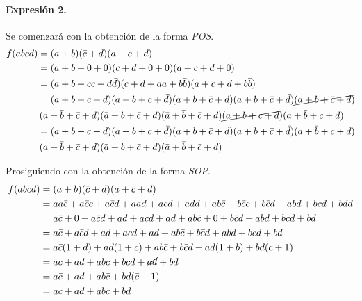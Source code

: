\documentclass[../procedimientos.tex]{subfiles}
\begin{document}
\paragraph{Expresión 2.} Se comenzará con la obtención de la forma 
\textit{POS}.
\begin{align*}
  f(abcd) &= (a + b) (\bar{c} + d)(a + c + d)\\
  &= (a + b + 0 + 0) (\bar{c} + d + 0 + 0)(a + c + d + 0)\\
  &= (a + b + c\bar{c} + d\bar{d})(\bar{c} + d + a\bar{a} + b\bar{b})(a + c + d + b 
  \bar{b})\\
  &= (a + b + c + d) (a + b + c + \bar{d}) (a + b + \bar{c} + d) (a + b + \bar{c} 
  + \bar{d}) \cancel{(a + b + \bar{c} + d)}\\
  &\,  (a + \bar{b} + \bar{c} + d) (\bar{a} + b + \bar{c} + d) (\bar{a} + \bar{b} + 
  \bar{c} + d) \cancel{(a + b + c + d)} (a + \bar{b} + c + d)\\
  &= (a + b + c + d) (a + b + c + \bar{d}) (a + b + \bar{c} + d) (a + b + \bar{c} 
  + \bar{d}) (a + \bar{b} + c + d)\\
  &\,  (a + \bar{b} + \bar{c} + d)(\bar{a} + b + \bar{c} + d) (\bar{a} + \bar{b} + 
  \bar{c} + d)
\end{align*}

Prosiguiendo con la obtención de la forma \textit{SOP}.
\begin{align*}
  f(abcd) &= (a + b) (\bar{c} + d)(a + c + d)\\
  &= a a \bar{c} + a \bar{c} c + a \bar{c} d + a a d + a c d + a d d + a b \bar{c} 
+ b \bar{c} c + b \bar{c} d + a b d + b c d + b d d\\
  &= a \bar{c} + 0 + a \bar{c} d + a d + a c d + a d + a b \bar{c} + 0 + b \bar{c} 
d + a b d + b c d + b d\\
  &= a \bar{c} + a \bar{c} d + a d + a c d + a d + a b \bar{c} + b \bar{c} d + a b 
d + b c d + b d\\
  &= a \bar{c} (1 + d) + a d (1 + c) + a b \bar{c} + b \bar{c} d + ad (1 + b) + 
  bd( c + 1)\\
  &= a \bar{c} + a d + a b \bar{c} + b \bar{c} d + \cancel{ad}  + bd\\
  &= a \bar{c} + a d + a b \bar{c} + bd(\bar{c} + 1)\\
  &= a \bar{c} + a d + a b \bar{c} + bd\\
\end{align*}
\end{document}
